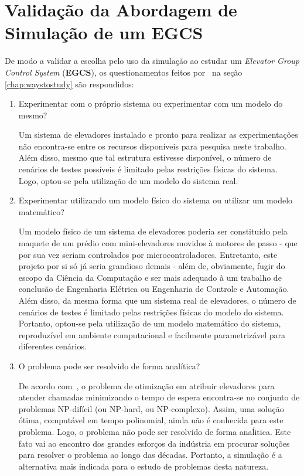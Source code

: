 \section{Validação da Abordagem de Simulação de um EGCS}

De modo a validar a escolha pelo uso da simulação ao estudar um \textit{Elevator
Group Control System} (\textbf{EGCS}), os questionamentos feitos
por~\cite{Banks,Law} na seção \ref{chap:waystostudy} são respondidos:

\begin{enumerate}
\item Experimentar com o próprio sistema ou experimentar com um modelo do mesmo?

Um sistema de elevadores instalado e pronto para realizar as experimentações não
encontra-se entre os recursos disponíveis para pesquisa neste trabalho. Além
disso, mesmo que tal estrutura estivesse disponível, o número de cenários de
testes possíveis é limitado pelas restrições físicas do sistema. Logo, optou-se
pela utilização de um modelo do sistema real.

\item Experimentar utilizando um modelo físico do sistema ou utilizar um modelo
matemático?

Um modelo físico de um sistema de elevadores poderia ser constituído pela
maquete de um prédio com mini-elevadores movidos à motores de passo - que por
sua vez seriam controlados por microcontroladores. Entretanto, este projeto por
si só já seria grandioso demais - além de, obviamente, fugir do escopo da
Ciência da Computação e ser mais adequado à um trabalho de conclusão de
Engenharia Elétrica ou Engenharia de Controle e Automação. Além disso, da mesma
forma que um sistema real de elevadores, o número de cenários de testes é
limitado pelas restrições físicas do modelo do sistema. Portanto, optou-se pela
utilização de um modelo matemático do sistema, reproduzível em ambiente
computacional e facilmente parametrizável para diferentes cenários.

\item O problema pode ser resolvido de forma analítica?

De acordo com~\cite{SeKo99}, o problema de otimização em atribuir elevadores
para atender chamadas minimizando o tempo de espera encontra-se no conjunto de
problemas NP-difícil (ou NP-hard, ou NP-complexo). Assim, uma solução ótima,
computável em tempo polinomial, ainda não é conhecida para este problema. Logo,
o problema não pode ser resolvido de forma anaĺitica. Este fato vai ao encontro
dos grandes esforços da indústria em procurar soluções para resolver o problema
ao longo das décadas. Portanto, a simulação é a alternativa mais indicada para o
estudo de problemas desta natureza.

\end{enumerate}

